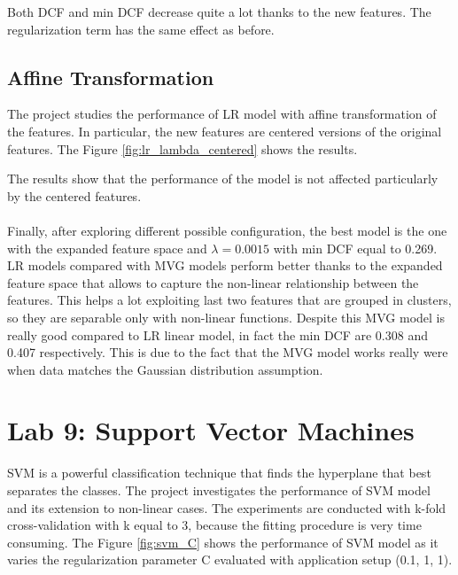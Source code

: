 \documentclass{article}
\begin{document}
Both DCF and min DCF decrease quite a lot thanks to the new features. The regularization term has the same effect as before.

\subsection{Affine Transformation}
The project studies the performance of LR model with affine transformation of the features. In particular, the new features are centered versions of the original features. The Figure \ref{fig:lr_lambda_centered} shows the results.

The results show that the performance of the model is not affected particularly by the centered features.\\\\

Finally, after exploring different possible configuration, the best model is the one with the expanded feature space and $\lambda = 0.0015$ with min DCF equal to 0.269. LR models compared with MVG models perform better thanks to the expanded feature space that allows to capture the non-linear relationship between the features. This helps a lot exploiting last two features that are grouped in clusters, so they are separable only with non-linear functions. Despite this MVG model is really good compared to LR linear model, in fact the min DCF are 0.308 and 0.407 respectively. This is due to the fact that the MVG model works really were when data matches the Gaussian distribution assumption.

\section{Lab 9: Support Vector Machines}
\label{sec:svm}
SVM is a powerful classification technique that finds the hyperplane that best separates the classes. The project investigates the performance of SVM model and its extension to non-linear cases. The experiments are conducted with k-fold cross-validation with k equal to 3, because the fitting procedure is very time consuming. The Figure \ref{fig:svm_C} shows the performance of SVM model as it varies the regularization parameter C evaluated with application setup (0.1, 1, 1).
\end{document}
